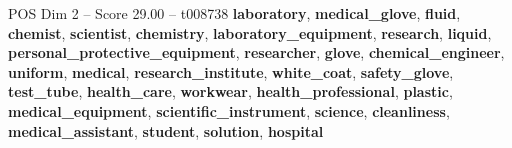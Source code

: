 \begin{textsample}{POS Dim 2 – Score 29.00 – t008738}  \label{ex:f2_pos_023}
\textbf{laboratory}, \textbf{medical\_glove}, \textbf{fluid}, \textbf{chemist}, \textbf{scientist}, \textbf{chemistry}, \textbf{laboratory\_equipment}, \textbf{research}, \textbf{liquid}, \textbf{personal\_protective\_equipment}, \textbf{researcher}, \textbf{glove}, \textbf{chemical\_engineer}, \textbf{uniform}, \textbf{medical}, \textbf{research\_institute}, \textbf{white\_coat}, \textbf{safety\_glove}, \textbf{test\_tube}, \textbf{health\_care}, \textbf{workwear}, \textbf{health\_professional}, \textbf{plastic}, \textbf{medical\_equipment}, \textbf{scientific\_instrument}, \textbf{science}, \textbf{cleanliness}, \textbf{medical\_assistant}, \textbf{student}, \textbf{solution}, \textbf{hospital}

\end{textsample}
